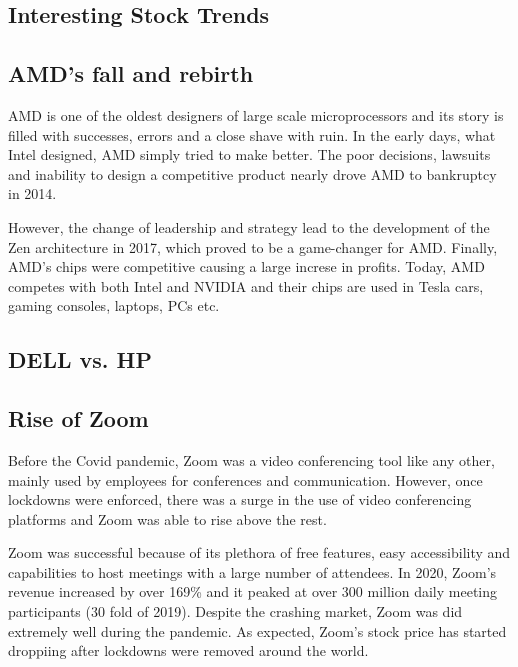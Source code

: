 \documentclass[11pt, twocolumn]{article}
\begin{document}
\begin{justify}
\vspace{-5pt}



\section{\large Interesting Stock Trends}
\vspace{-5pt}



\subsection{AMD's fall and rebirth}
AMD is one of the oldest designers of large scale microprocessors and its story is filled with successes, errors and a close shave with ruin. In the early days, what Intel designed, AMD simply tried to make better. The poor decisions, lawsuits and inability to design a competitive product nearly drove AMD to bankruptcy in 2014.
\vspace{1em}


However, the change of leadership and strategy lead to the development of the Zen architecture in 2017, which proved to be a game-changer for AMD. Finally, AMD's chips were competitive causing a large increse in profits. Today, AMD competes with both Intel and NVIDIA and their chips are used in Tesla cars, gaming consoles, laptops, PCs etc.
\vspace{-5pt}

\subsection{DELL vs. HP}
\vspace{-5pt}

\subsection{Rise of Zoom}
Before the Covid pandemic, Zoom was a video conferencing tool like any other, mainly used by employees for conferences and communication. However, once lockdowns were enforced, there was a surge in the use of video conferencing platforms and Zoom was able to rise above the rest.
\vspace{1em}


Zoom was successful because of its plethora of free features, easy accessibility and capabilities to host meetings with a large number of attendees. In 2020, Zoom's revenue increased by over 169\%
and it peaked at over 300 million daily meeting participants (30 fold of 2019). Despite the crashing market, Zoom was did extremely well during the pandemic. As expected, Zoom's stock price has started droppiing after lockdowns were removed around the world.
\vspace{-5pt}


\end{justify}
\end{document}

